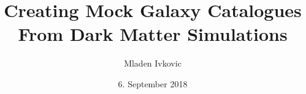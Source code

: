 




\title{Creating Mock Galaxy Catalogues From Dark Matter Simulations}

\author[M. Ivkovic]{Mladen Ivkovic}
\date[06.09.2018]{6. September 2018}





\begin{frame}{}
	\titlepage
\end{frame}















